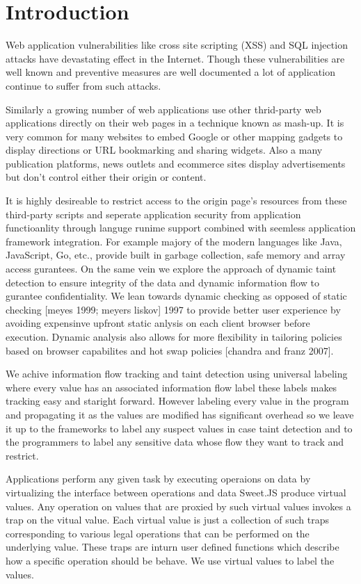 \chapter{Introduction}

Web application vulnerabilities like cross site scripting (XSS) and SQL injection attacks have devastating effect in the Internet. Though these vulnerabilities are well known and  preventive measures are well documented a lot of application continue to suffer from such attacks. 

Similarly a growing number of web applications use other thrid-party web applications directly on their web pages in a technique known as mash-up. It is very common for many websites to embed Google or other mapping gadgets to display directions or URL bookmarking and sharing widgets. Also a many publication platforms, news outlets and ecommerce sites display advertisements but don't control either their origin or content.

It is highly desireable to restrict access to the origin page's resources from these third-party scripts and seperate application security from application functioanlity through languge runime support combined with seemless application framework integration. For example majory of the modern languages like Java, JavaScript, Go, etc., provide built in garbage collection, safe memory and array access gurantees. On the same vein we explore the approach of dynamic taint detection to ensure integrity of the data and dynamic information flow to gurantee confidentiality. We lean towards dynamic checking as opposed of static checking  [meyes 1999; meyers liskov] 1997 to provide better user experience by avoiding expensinve upfront static anlysis on each client browser before execution. Dynamic analysis also allows for more flexibility in tailoring policies based on browser capabilites and hot swap policies [chandra and franz 2007].

We achive information flow tracking and taint detection using universal labeling where every value has an associated information flow label these labels makes tracking easy and staright forward. However labeling every value in the program and propagating it as the values are modified has significant overhead so we leave it up to the frameworks to label any suspect values in case taint detection and to the programmers to label any sensitive data whose flow they want to track and restrict.

Applications perform any given  task by executing operaions on data  by virtualizing the interface between operations and data Sweet.JS produce virtual values. Any operation on values that are proxied by such virtual values invokes a trap on the vitual value. Each virtual value is just a collection of such traps corresponding to various legal operations that can be performed on the underlying value. These traps are inturn user defined functions which describe how a specific operation should be behave. We use virtual values to label the values.

